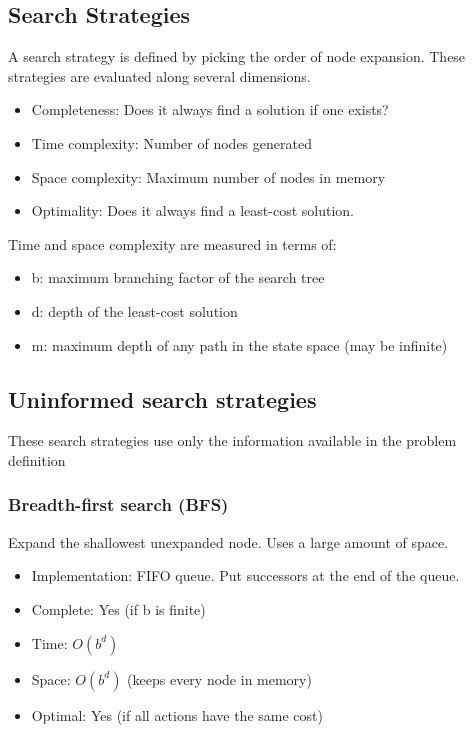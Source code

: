 \documentclass[11pt, oneside]{article}   	%
\begin{document}
\subsection{Search Strategies}
A search strategy is defined by picking the order of node expansion. These strategies are evaluated along several dimensions.
\begin{itemize}
\item Completeness: Does it always find a solution if one exists?
\item Time complexity: Number of nodes generated
\item Space complexity: Maximum number of nodes in memory
\item Optimality: Does it always find a least-cost solution.
\end{itemize}

Time and space complexity are measured in terms of:
\begin{itemize}
\item b: maximum branching factor of the search tree
\item d: depth of the least-cost solution
\item m: maximum depth of any path in the state space (may be infinite)
\end{itemize}

\subsection{Uninformed search strategies}
These search strategies use only the information available in the problem definition
\subsubsection{Breadth-first search (BFS)}
Expand the shallowest unexpanded node. Uses a large amount of space.
\begin{itemize}
\item Implementation: FIFO queue. Put successors at the end of the queue.
\item Complete: Yes (if b is finite)
\item Time: $O(b^d)$
\item Space: $O(b^d)$ (keeps every node in memory) 
\item Optimal: Yes (if all actions have the same cost)
\end{itemize}
\end{document}
